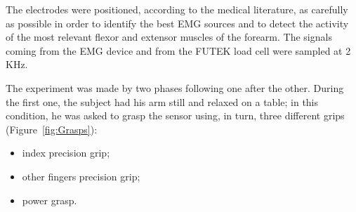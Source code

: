 The electrodes were positioned, according to the medical literature, as carefully as possible in order to identify the best EMG sources and to detect the activity of the most relevant flexor and extensor muscles of the forearm. The signals coming from the EMG device and from the FUTEK load cell were sampled at 2 KHz.

The experiment was made by two phases following one after the other. During the first one, the subject had his arm still and relaxed on a table; in this condition, he was asked to grasp the sensor using, in turn, three different grips (Figure~\ref{fig:Grasps}):
\begin{itemize}
	\item index precision grip;
	\item other fingers precision grip;
	\item power grasp.
\end{itemize}

